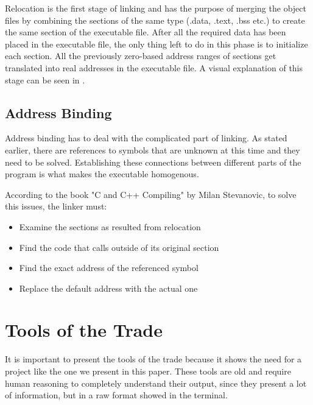 Relocation is the first stage of linking and has the purpose of merging the object files by combining the sections of the same type (.data, .text, .bss etc.) to create the same section of the executable file. After all the required data has been placed in the executable file, the only thing left to do in this phase is to initialize each section. All the previously zero-{}based address ranges of sections get translated into real addresses in the executable file. A visual explanation of this stage can be seen in .


\subsection{Address Binding}
\label{sub-sec:addr-bind}

Address binding has to deal with the complicated part of linking. As stated earlier, there are references to symbols that are unknown at this time and they need to be solved. Establishing these connections between different parts of the program is what makes the executable homogenous.

According to the book "C and C++ Compiling" by Milan Stevanovic\cite{milan}, to solve this issues, the linker must:

\begin{itemize}  
	\item Examine the sections as resulted from relocation
	\item Find the code that calls outside of its original section
	\item Find the exact address of the referenced symbol
	\item Replace the default address with the actual one
\end{itemize}

\section{Tools of the Trade}
\label{sec:tott}

It is important to present the tools of the trade because it shows the need for a project like the one we present in this paper. These tools are old and require human reasoning to completely understand their output, since they present a lot of information, but in a raw format showed in the terminal.

